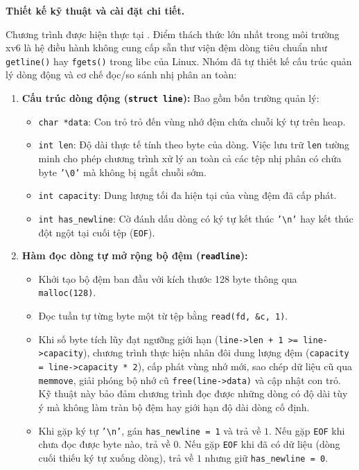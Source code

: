 \documentclass[12pt,a4paper]{article}
\begin{document}
\textbf{Thiết kế kỹ thuật và cài đặt chi tiết.}

Chương trình được hiện thực tại . Điểm thách thức lớn nhất trong môi trường xv6 là hệ điều hành không cung cấp sẵn thư viện đệm dòng tiêu chuẩn như \texttt{getline()} hay \texttt{fgets()} trong libc của Linux. Nhóm đã tự thiết kế cấu trúc quản lý dòng động và cơ chế đọc/so sánh nhị phân an toàn:
\begin{enumerate}
  \item \textbf{Cấu trúc dòng động (\texttt{struct line}):}
  Bao gồm bốn trường quản lý:
  \begin{itemize}
    \item \texttt{char *data}: Con trỏ trỏ đến vùng nhớ đệm chứa chuỗi ký tự trên heap.
    \item \texttt{int len}: Độ dài thực tế tính theo byte của dòng. Việc lưu trữ \texttt{len} tường minh cho phép chương trình xử lý an toàn cả các tệp nhị phân có chứa byte \texttt{'\textbackslash 0'} mà không bị ngắt chuỗi sớm.
    \item \texttt{int capacity}: Dung lượng tối đa hiện tại của vùng đệm đã cấp phát.
    \item \texttt{int has\_newline}: Cờ đánh dấu dòng có ký tự kết thúc \texttt{'\textbackslash n'} hay kết thúc đột ngột tại cuối tệp (\texttt{EOF}).
  \end{itemize}
  \item \textbf{Hàm đọc dòng tự mở rộng bộ đệm (\texttt{readline}):}
  \begin{itemize}
    \item Khởi tạo bộ đệm ban đầu với kích thước 128 byte thông qua \texttt{malloc(128)}.
    \item Đọc tuần tự từng byte một từ tệp bằng \texttt{read(fd, \&c, 1)}.
    \item Khi số byte tích lũy đạt ngưỡng giới hạn (\texttt{line->len + 1 >= line->capacity}), chương trình thực hiện nhân đôi dung lượng đệm (\texttt{capacity = line->capacity * 2}), cấp phát vùng nhớ mới, sao chép dữ liệu cũ qua \texttt{memmove}, giải phóng bộ nhớ cũ \texttt{free(line->data)} và cập nhật con trỏ. Kỹ thuật này bảo đảm chương trình đọc được những dòng có độ dài tùy ý mà không làm tràn bộ đệm hay giới hạn độ dài dòng cố định.
    \item Khi gặp ký tự \texttt{'\textbackslash n'}, gán \texttt{has\_newline = 1} và trả về $1$. Nếu gặp \texttt{EOF} khi chưa đọc được byte nào, trả về $0$. Nếu gặp \texttt{EOF} khi đã có dữ liệu (dòng cuối thiếu ký tự xuống dòng), trả về $1$ nhưng giữ \texttt{has\_newline = 0}.

\end{itemize}
\end{enumerate}
\end{document}
